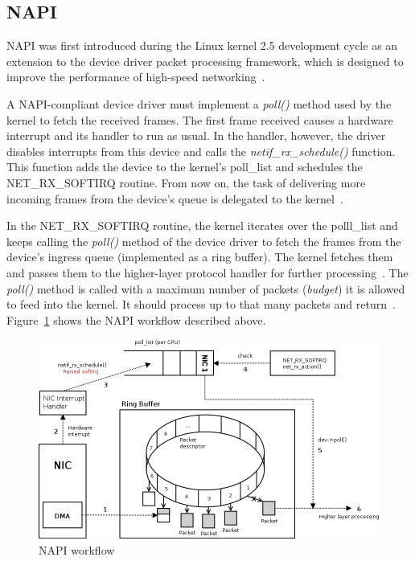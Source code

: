
\subsection{NAPI}\label{subsec:linux-ingress-napi}
NAPI was first introduced during the Linux kernel 2.5 development cycle as
an extension to the device driver packet processing framework,
which is designed to improve the performance of high-speed networking~\cite{linux-foundation-napi}.

A NAPI-compliant device driver must implement a {\it{poll()}} method used by the kernel to fetch the received frames.
The first frame received causes a hardware interrupt and its handler to run as usual.
In the handler, however, the driver disables interrupts from this device
and calls the {\it{netif\_rx\_schedule()}} function.
This function adds the device to the kernel's poll\_list and schedules the NET\_RX\_SOFTIRQ routine.
From now on, the task of delivering more incoming frames from
the device's queue is delegated to the kernel~\cite{understanding-internals}.

In the NET\_RX\_SOFTIRQ routine, the kernel iterates over the polll\_list and keeps calling
the {\it{poll()}} method of the device driver to fetch the frames from the device's ingress queue (implemented as a ring buffer).
The kernel fetches them and passes them to the higher-layer protocol handler for further processing~\cite{linux-kernel-networking}.
The {\it{poll()}} method is called with a maximum number
of packets ({\it{budget}}) it is allowed to feed into the kernel.
It should process up to that many packets and return~\cite{reworking-napi}.
Figure~\ref{fig:linux-napi-workflow} shows the NAPI workflow described above.

\begin{figure}
	\centering
	\includegraphics[width=15cm,keepaspectratio]{fig/napi-workflow.png}
	\caption{NAPI workflow}
	\label{fig:linux-napi-workflow}
\end{figure}

